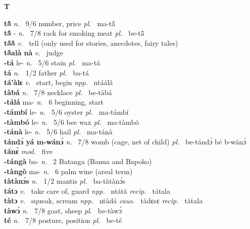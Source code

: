 \medskip
\noindent \large {\bfseries T}\normalsize\\
\medskip

\noindent
{\bfseries tã̂}  {\itshape n.~} 9/6 number, price {\itshape pl.~} ma-tã̂    \\ 
{\bfseries tã̂} - {\itshape n.~} 7/8 rack for smoking meat {\itshape pl.~} be-tã̂    \\ 
{\bfseries tã́ã̀}  {\itshape v.~} tell (only used for stories, anecdotes, fairy tales)    \\ 
{\bfseries tã́alà nà}  {\itshape v.~} judge    \\ 
{\bfseries -tá} le- {\itshape n.~} 5/6 stain {\itshape pl.~} ma-tá    \\ 
{\bfseries tá}  {\itshape n.~} 1/2 father {\itshape pl.~} ba-tá    \\ 
{\bfseries tá'àlɛ}  {\itshape v.~} start, begin    {\itshape npp.~} ntáálâ  \\ 
{\bfseries tàbá}  {\itshape n.~} 7/8 necklace {\itshape pl.~} be-tàbá    \\ 
{\bfseries -tálá} ma- {\itshape n.~} 6 beginning, start    \\ 
{\bfseries -támbí} le- {\itshape n.~} 5/6 oyster {\itshape pl.~} ma-támbí    \\ 
{\bfseries -tàmbó} le- {\itshape n.~} 5/6 bee wax {\itshape pl.~} ma-tàmbó    \\ 
{\bfseries -tánà} le- {\itshape n.~} 5/6 hail {\itshape pl.~} ma-tánà    \\ 
{\bfseries tándɔ́ yá m-wánɔ̀}  {\itshape n.~} 7/8 womb (cage, net of child) {\itshape pl.~} be-tándɔ́ bé b-wánɔ̀    \\ 
{\bfseries tánɛ̀}  {\itshape mod.~} five    \\ 
{\bfseries -tángà} ba- {\itshape n.~} 2 Batanga (Banua and Bapoko)    \\ 
{\bfseries -tàngò} ma- {\itshape n.~} 6 palm wine (areal term)    \\ 
{\bfseries tàtànɔ́s}  {\itshape n.~} 1/2 mantis {\itshape pl.~} ba-tàtànɔ́s    \\ 
{\bfseries tátɔ}  {\itshape v.~} take care of, guard   {\itshape npp.~} ntátâ {\itshape recip.~} tátala  \\ 
{\bfseries tàtɔ}  {\itshape v.~} squeak, scream   {\itshape npp.~} ntàdá {\itshape caus.~} tàdɛsɛ {\itshape recip.~} tàtala  \\ 
{\bfseries tàwɔ̀}  {\itshape n.~} 7/8 goat, sheep {\itshape pl.~} be-tàwɔ̀    \\ 
{\bfseries té}  {\itshape n.~} 7/8 posture, position {\itshape pl.~} be-té    \\ 

